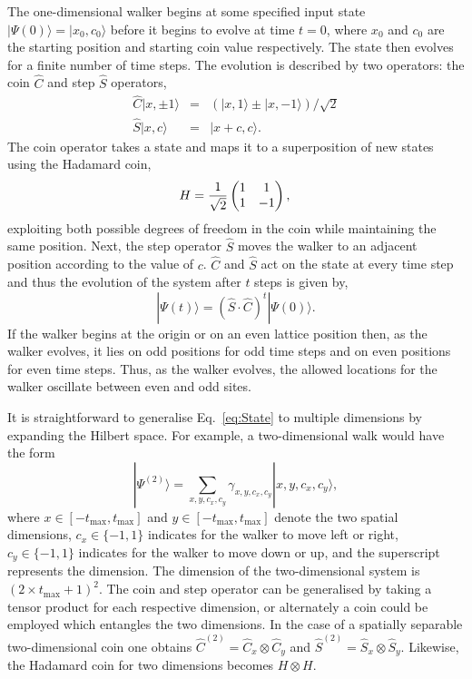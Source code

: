 \documentclass[aps,pra,twocolumn,amsmath,amssymb,nofootinbib,superscriptaddress]{revtex4}
\newcommand{\ket}[1]{|#1\rangle}
\begin{document}
The one-dimensional walker begins at some specified input state $\ket{\Psi(0)}=\ket{x_{0},c_{0}}$ before it begins to evolve at time $t=0$, where $x_{0}$ and $c_{0}$ are the starting position and starting coin value respectively. The state then evolves for a finite number of time steps. The evolution is described by two operators: the coin $\hat{C}$ and step $\hat{S}$ operators, 
\begin{eqnarray} 
\hat{C} \ket{x, \pm 1}&=&(\ket{x,1}\pm \ket{x,-1})/\sqrt{2} \label{eq:coin} \\ \nonumber
\hat{S}\ket{x, c}&=&\ket{x+c,c} \label{eq:step}.
\end{eqnarray}
The coin operator takes a state and maps it to a superposition of new states using the Hadamard coin,
\begin{equation} \label{eq:H}
H= \frac{1}{\sqrt{2}} \begin{pmatrix}
1 & 1 \\
1 & -1\\
\end{pmatrix},\\
\end{equation}
exploiting both possible degrees of freedom in the coin while maintaining the same position. Next, the step operator $\hat{S}$ moves the walker to an adjacent position according to the value of $c$. $\hat{C}$ and $\hat{S}$ act on the state at every time step and thus the evolution of the system after $t$ steps is given by,
\begin{equation}
\ket{\Psi(t)} = (\hat{S}\cdot \hat{C})^{t}\ket{\Psi(0)}.
\end{equation}
If the walker begins at the origin or on an even lattice position then, as the walker evolves, it lies on odd positions for odd time steps and on even positions for even time steps. Thus, as the walker evolves, the allowed locations for the walker oscillate between even and odd sites.

It is straightforward to generalise Eq.~\ref{eq:State} to multiple dimensions by expanding the Hilbert space. For example, a two-dimensional walk would have the form
\begin{equation}
\ket{\Psi^{(2)}}=\sum_{x,y,c_{x},c_{y}} \gamma_{x,y,c_{x},c_{y}} \ket{x,y, c_{x},c_{y}},
\end{equation}
where $x\in [-t_\mathrm{max},t_\mathrm{max}]$ and $y\in [-t_\mathrm{max},t_\mathrm{max}]$ denote the two spatial dimensions, $c_{x} \in \{-1,1\}$ indicates for the walker to move left or right, $c_{y} \in \{-1,1\}$ indicates for the walker to move down or up, and the superscript represents the dimension. The dimension of the two-dimensional system is $(2\times t_{\mathrm{max}}+1)^2$. The coin and step operator can be generalised by taking a tensor product for each respective dimension, or alternately a coin could be employed which entangles the two dimensions. In the case of a spatially separable two-dimensional coin one obtains $\hat{C}^{(2)}=\hat{C}_{x}\otimes \hat{C}_{y}$ and $\hat{S}^{(2)}=\hat{S}_{x}\otimes \hat{S}_{y}$. Likewise, the Hadamard coin for two dimensions becomes $H \otimes H$.
\end{document}
